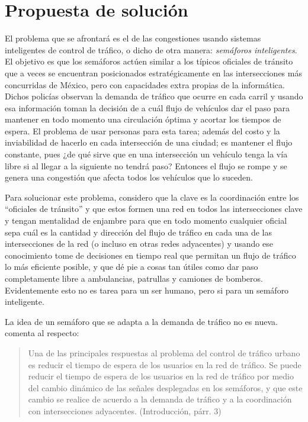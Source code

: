 \hypertarget{propuesta-de-soluciuxf3n}{%
\section{Propuesta de solución}\label{propuesta-de-soluciuxf3n}}

El problema que se afrontará es el de las congestiones usando sistemas
inteligentes de control de tráfico, o dicho de otra manera:
\emph{semáforos inteligentes}. El objetivo es que los semáforos actúen
similar a los típicos oficiales de tránsito que a veces se encuentran
posicionados estratégicamente en las intersecciones más concurridas de
México, pero con capacidades extra propias de la informática. Dichos
policías observan la demanda de tráfico que ocurre en cada carril y
usando esa información toman la decisión de a cuál flujo de vehículos
dar el paso para mantener en todo momento una circulación óptima y
acortar los tiempos de espera. El problema de usar personas para esta
tarea; además del costo y la inviabilidad de hacerlo en cada
intersección de una ciudad; es mantener el flujo constante, pues ¿de qué
sirve que en una intersección un vehículo tenga la vía libre si al
llegar a la siguiente no tendrá paso? Entonces el flujo se rompe y se
genera una congestión que afecta todos los vehículos que lo suceden.

Para solucionar este problema, considero que la clave es la coordinación
entre los ``oficiales de tránsito'' y que estos formen una red en todos
las intersecciones clave y tengan mentalidad de enjambre para que en
todo momento cualquier oficial sepa cuál es la cantidad y dirección del
flujo de tráfico en cada una de las intersecciones de la red (o incluso
en otras redes adyacentes) y usando ese conocimiento tome de decisiones
en tiempo real que permitan un flujo de tráfico lo más eficiente
posible, y que dé pie a cosas tan útiles como dar paso completamente
libre a ambulancias, patrullas y camiones de bomberos. Evidentemente
esto no es tarea para un ser humano, pero si para un semáforo
inteligente.

La idea de un semáforo que se adapta a la demanda de tráfico no es
nueva. \textcite{JoelTrejo2006} comenta al respecto:

\begin{quote}
Una de las principales respuestas al problema del control de tráfico
urbano es reducir el tiempo de espera de los usuarios en la red de
tráfico. Se puede reducir el tiempo de espera de los usuarios en la red
de tráfico por medio del cambio dinámico de las señales desplegadas en
los semáforos, y que este cambio se realice de acuerdo a la demanda de
tráfico y a la coordinación con intersecciones adyacentes.
(Introducción, párr. 3)
\end{quote}

